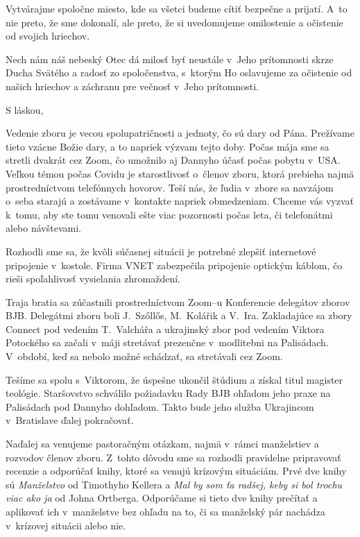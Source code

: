 Vytvárajme spoločne miesto, kde sa všetci budeme cítiť bezpečne a prijatí. A~to nie preto, že sme dokonalí, ale preto, že si uvedomujeme omilostenie a očistenie od svojich hriechov.

Nech nám náš nebeský Otec dá milosť byť neustále v~Jeho prítomnosti skrze Ducha Svätého a radosť zo spoločenstva, s~ktorým Ho oslavujeme za očistenie od našich hriechov a záchranu pre večnosť v~Jeho prítomnosti.

S láskou,



Vedenie zboru je vecou spolupatričnosti a jednoty, čo sú dary od Pána. Prežívame tieto vzácne Božie dary, a to napriek výzvam tejto doby. Počas mája sme sa stretli dvakrát cez Zoom, čo umožnilo aj Dannyho účasť počas pobytu v~USA. Veľkou témou počas Covidu je starostlivosť o~členov zboru, ktorá prebieha najmä prostredníctvom telefónnych hovorov. Teší nás, že ľudia v~zbore sa navzájom o~seba starajú a zostávame v~kontakte napriek obmedzeniam. Chceme vás vyzvať k~tomu, aby ste tomu venovali ešte viac pozornosti počas leta, či telefonátmi alebo návštevami.

Rozhodli sme sa, že kvôli súčasnej situácii je potrebné zlepšiť internetové pripojenie v~kostole. Firma VNET zabezpečila pripojenie optickým káblom, čo rieši spoľahlivosť vysielania zhromaždení.

Traja bratia sa zúčastnili prostredníctvom Zoom--u Konferencie delegátov zborov BJB. Delegátmi zboru boli J.~Szőllős, M.~Kolářik a V.~Ira. Zakladajúce sa zbory Connect pod vedením T.~Valchářa a ukrajinský zbor pod vedením Viktora Potockého sa začali v~máji stretávať prezenčne v~modlitebni na Palisádach. V~období, keď sa nebolo možné schádzať, sa stretávali cez Zoom.

Tešíme sa spolu s~Viktorom, že úspešne ukončil štúdium a získal titul magister teológie. Staršovstvo schválilo požiadavku Rady BJB ohľadom jeho praxe na Palisádach pod Dannyho dohľadom. Takto bude jeho služba Ukrajincom v~Bratislave ďalej pokračovať.

Naďalej sa venujeme pastoračným otázkam, najmä v~rámci manželstiev a rozvodov členov zboru. Z~tohto dôvodu sme sa rozhodli pravidelne pripravovať recenzie a odporúčať knihy, ktoré sa venujú krízovým situáciám. Prvé dve knihy sú {\it Manželstvo} od Timothyho Kellera a {\it Mal by som ťa radšej, keby si bol trochu viac ako ja} od Johna Ortberga. Odporúčame si tieto dve knihy prečítať a aplikovať ich v~manželstve bez ohľadu na to, či sa manželský pár nachádza v~krízovej situácii alebo nie.

